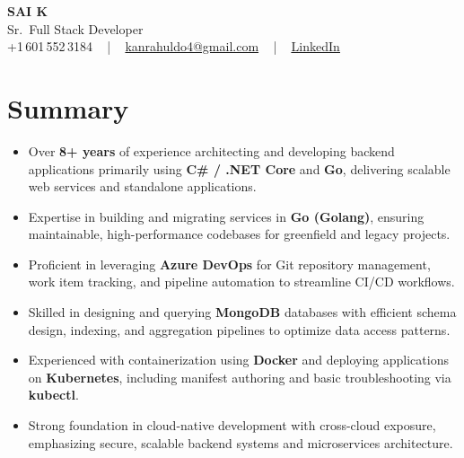 \documentclass[letterpaper,11pt]{article}
\newcommand{\resumeItem}[1]{
  \item\footnotesize{
    {#1 \vspace{-2pt}}
  }
}
\newcommand{\resumeItemListStart}{\begin{itemize}[leftmargin=*]}
\newcommand{\resumeItemListEnd}{\end{itemize}\vspace{-5pt}}
\begin{document}
\begin{center}
    {\fontsize{14pt}{12pt}\selectfont \textbf{\MakeUppercase{Sai K}}}\\ \vspace{2pt}
    \fontsize{10pt}{12pt}\selectfont Sr.\ Full Stack Developer\\ \vspace{2pt}
    \fontsize{10pt}{12pt}\selectfont +1\,601\,552\,3184 ~ | ~
    \href{mailto:kanrahuldo4@gmail.com}{kanrahuldo4@gmail.com} ~ | ~
    \href{https://www.linkedin.com/in/srrrk/}{\color{blue}\underline{LinkedIn}}
    \vspace{-10pt}
\end{center}

\section{Summary}
\fontsize{9pt}{10pt}\selectfont
\resumeItemListStart
  \resumeItem{Over \textbf{8+ years} of experience architecting and developing backend applications primarily using \textbf{C\# / .NET Core} and \textbf{Go}, delivering scalable web services and standalone applications.}
  \resumeItem{Expertise in building and migrating services in \textbf{Go (Golang)}, ensuring maintainable, high-performance codebases for greenfield and legacy projects.}
  \resumeItem{Proficient in leveraging \textbf{Azure DevOps} for Git repository management, work item tracking, and pipeline automation to streamline CI/CD workflows.}
  \resumeItem{Skilled in designing and querying \textbf{MongoDB} databases with efficient schema design, indexing, and aggregation pipelines to optimize data access patterns.}
  \resumeItem{Experienced with containerization using \textbf{Docker} and deploying applications on \textbf{Kubernetes}, including manifest authoring and basic troubleshooting via \textbf{kubectl}.}
  \resumeItem{Strong foundation in cloud-native development with cross-cloud exposure, emphasizing secure, scalable backend systems and microservices architecture.}
\resumeItemListEnd
\vspace{-6pt}

\end{document}
